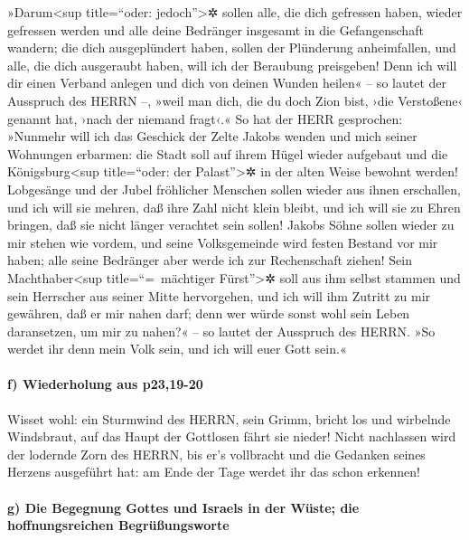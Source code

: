 »Darum\textless sup title=``oder: jedoch''\textgreater✲
sollen alle, die dich gefressen haben, wieder gefressen werden und alle
deine Bedränger insgesamt in die Gefangenschaft wandern; die dich
ausgeplündert haben, sollen der Plünderung anheimfallen, und alle, die
dich ausgeraubt haben, will ich der Beraubung preisgeben!
Denn ich will dir einen Verband anlegen und dich von
deinen Wunden heilen« -- so lautet der Ausspruch des HERRN --, »weil man
dich, die du doch Zion bist, ›die Verstoßene‹ genannt hat, ›nach der
niemand fragt‹.« So hat der HERR gesprochen: »Nunmehr
will ich das Geschick der Zelte Jakobs wenden und mich seiner Wohnungen
erbarmen: die Stadt soll auf ihrem Hügel wieder aufgebaut und die
Königsburg\textless sup title=``oder: der Palast''\textgreater✲ in der
alten Weise bewohnt werden! Lobgesänge und der Jubel
fröhlicher Menschen sollen wieder aus ihnen erschallen, und ich will sie
mehren, daß ihre Zahl nicht klein bleibt, und ich will sie zu Ehren
bringen, daß sie nicht länger verachtet sein sollen!
Jakobs Söhne sollen wieder zu mir stehen wie vordem, und
seine Volksgemeinde wird festen Bestand vor mir haben; alle seine
Bedränger aber werde ich zur Rechenschaft ziehen! Sein
Machthaber\textless sup title=``=~mächtiger Fürst''\textgreater✲ soll
aus ihm selbst stammen und sein Herrscher aus seiner Mitte hervorgehen,
und ich will ihm Zutritt zu mir gewähren, daß er mir nahen darf; denn
wer würde sonst wohl sein Leben daransetzen, um mir zu nahen?« -- so
lautet der Ausspruch des HERRN. »So werdet ihr denn mein
Volk sein, und ich will euer Gott sein.«

\hypertarget{f-wiederholung-aus-p2319-20}{%
\paragraph{f) Wiederholung aus
\textbar p23,19-20}\label{f-wiederholung-aus-p2319-20}}

Wisset wohl: ein Sturmwind des HERRN, sein Grimm, bricht
los und wirbelnde Windsbraut, auf das Haupt der Gottlosen fährt sie
nieder! Nicht nachlassen wird der lodernde Zorn des
HERRN, bis er's vollbracht und die Gedanken seines Herzens ausgeführt
hat: am Ende der Tage werdet ihr das schon erkennen!

\hypertarget{g-die-begegnung-gottes-und-israels-in-der-wuxfcste-die-hoffnungsreichen-begruxfcuxdfungsworte}{%
\paragraph{g) Die Begegnung Gottes und Israels in der Wüste; die
hoffnungsreichen
Begrüßungsworte}\label{g-die-begegnung-gottes-und-israels-in-der-wuxfcste-die-hoffnungsreichen-begruxfcuxdfungsworte}}

